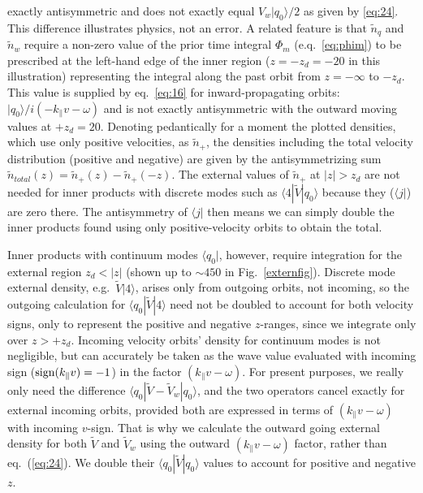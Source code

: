 \documentclass[12pt]{article}
\def\ket#1{|#1\rangle}
\def\bra#1{\langle#1}
\begin{document}
exactly antisymmetric and does not exactly equal $V_w\ket{q_0}/2$ as
given by \ref{eq:24}. This difference illustrates physics, not an
error. A related feature is that $\tilde n_q$ and $\tilde n_w$ require
a non-zero value of the prior time integral $\Phi_m$ (e.q.\
\ref{eq:phim}) to be prescribed at the left-hand edge of the inner
region ($z=-z_d=-20$ in this illustration) representing the integral
along the past orbit from $z=-\infty$ to $-z_d$. This value is supplied
by eq.\ \ref{eq:16} for inward-propagating orbits:
$\ket{q_0}/i(-k_\parallel v -\omega)$ and is not exactly antisymmetric
with the outward moving values at $+z_d=20$. Denoting pedantically for
a moment the plotted densities, which use only positive velocities, as
$\tilde n_+$, the densities including the total velocity distribution
(positive and negative) are given by the antisymmetrizing sum
$\tilde n_{total}(z)=\tilde n_+(z)-\tilde n_+(-z)$. The external
values of $\tilde n_+$ at $|z|>z_d$ are not needed for inner products
with discrete modes such as $\bra{4}|\tilde V\ket{q_0}$ because they
($\bra{j}|$) are zero there. The antisymmetry of $\bra{j}|$ then means
we can simply double the inner products found using only
positive-velocity orbits to obtain the total.

Inner products with continuum modes $\bra{q_0}|$, however, require
integration for the external region $z_d<|z|$ (shown up to $\sim 450$ in
Fig.\ \ref{externfig}). Discrete mode external density, e.g.\
$\tilde V \ket{4}$, arises only from outgoing orbits, not incoming, so
the outgoing calculation for $\bra{q_0}|\tilde V\ket{4}$ need not be
doubled to account for both velocity signs, only to represent the
positive and negative $z$-ranges, since we integrate only over
$z>+z_d$. Incoming velocity orbits' density for continuum modes is not
negligible, but can accurately be taken as the wave value evaluated
with incoming sign (${\rm sign}(k_\parallel v)=-1$) in the factor
$(k_\parallel v-\omega)$.  \iffalse Thus, incoming density in the
outer region is equal to outgoing times the factor
$R=\int_0^\infty (k_\parallel v-\omega)/(-k_\parallel v-\omega)\;
f_\infty(v)dv$, and the total external contribution to
$\bra{q_0}|\tilde V\ket{q_0}$ is $1+R$ times the outgoing.  \fi For
present purposes, we really only need the difference
$\bra{q_0}|\tilde V-\tilde V_w\ket{q_0}$, and the two operators cancel
exactly for external incoming orbits, provided both are expressed in
terms of $(k_\parallel v-\omega)$ with incoming $v$-sign.  That is why
we calculate the outward going external density for both $\tilde V$
and $\tilde V_w$ using the outward $(k_\parallel v-\omega)$ factor,
rather than eq.\ (\ref{eq:24}). We double their
$\bra{q_0}|\tilde V\ket{q_0}$ values to account for positive and
negative $z$.
\end{document}
